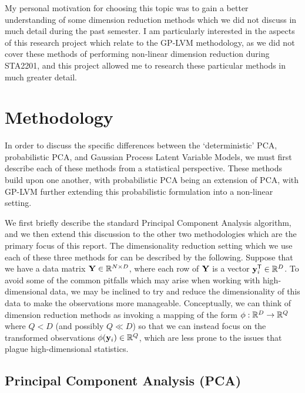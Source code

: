 \documentclass[12pt]{article}
\numberwithin{equation}{section}
\numberwithin{figure}{section}
\numberwithin{table}{section}
\begin{document}
My personal motivation for choosing this topic was to gain a better understanding of some dimension reduction methods which we did not discuss in much detail during the past semester. I am particularly interested in the aspects of this research project which relate to the GP-LVM methodology, as we did not cover these methods of performing non-linear dimension reduction during STA2201, and this project allowed me to research these particular methods in much greater detail.

\section{Methodology}\label{sec:methods}

In order to discuss the specific differences between the `deterministic' PCA, probabilistic PCA, and Gaussian Process Latent Variable Models, we must first describe each of these methods from a statistical perspective. These methods build upon one another, with probabilistic PCA being an extension of PCA, with GP-LVM further extending this probabilistic formulation into a non-linear setting. 

We first briefly describe the standard Principal Component Analysis algorithm, and we then extend this discussion to the other two methodologies which are the primary focus of this report. The dimensionality reduction setting which we use each of these three methods for can be described by the following. Suppose that we have a data matrix $\mathbf{Y} \in \mathbb{R}^{N \times D}$, where each row of $\mathbf{Y}$ is a vector $\mathbf{y}_{i}^{\scriptstyle{\mathsf{T}}} \in \mathbb{R}^{D}$. To avoid some of the common pitfalls which may arise when working with high-dimensional data, we may be inclined to try and reduce the dimensionality of this data to make the observations more manageable. Conceptually, we can think of dimension reduction methods as invoking a mapping of the form $\phi: \mathbb{R}^{D} \to \mathbb{R}^{Q}$ where $Q < D$ (and possibly $Q \ll D$) so that we can instead focus on the transformed observations $\phi(\mathbf{y}_{i}) \in \mathbb{R}^{Q}$, which are less prone to the issues that plague high-dimensional statistics.


\subsection{Principal Component Analysis (PCA)}
\end{document}
